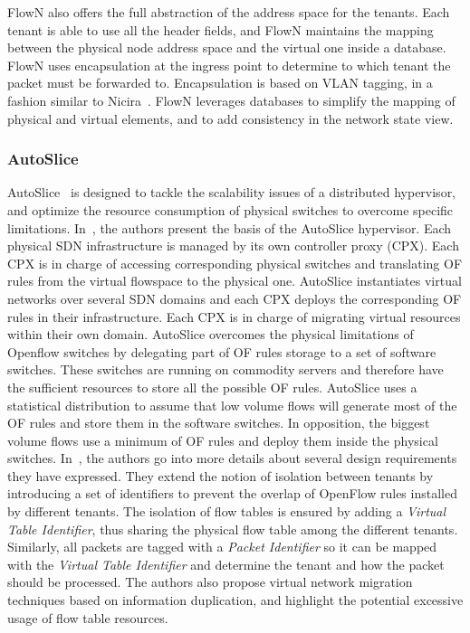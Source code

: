 FlowN also offers the full abstraction of the address space for the tenants.
Each tenant is able to use all the header fields, and FlowN maintains the mapping between the physical node address space and the virtual one inside a database. FlowN uses encapsulation at the ingress point to determine to which tenant the packet must be forwarded to. Encapsulation is based on VLAN tagging, in a fashion similar to Nicira~\cite{nicira}.   
FlowN leverages databases to simplify the mapping of physical and virtual elements, and to add consistency in the network state view.  


\subsubsection{AutoSlice}
AutoSlice~\cite{AutoSlice-Bozakov2012} is designed to tackle the scalability issues of a distributed hypervisor, and optimize the resource consumption of physical switches to overcome specific limitations.
In~\cite{AutoSlice-Bozakov2012}, the authors present the basis of the AutoSlice hypervisor.
Each physical SDN infrastructure is managed by its own controller proxy (CPX).
Each CPX is in charge of accessing corresponding physical switches and translating OF rules from the virtual flowspace to the physical one.
AutoSlice instantiates virtual networks over several SDN domains and each CPX deploys the corresponding OF rules in their infrastructure.
Each CPX is in charge of migrating virtual resources within their own domain.
AutoSlice overcomes the physical limitations of Openflow switches by delegating part of OF rules storage to a set of software switches.
These switches are running on commodity servers and therefore have the sufficient resources to store all the possible OF rules.
AutoSlice uses a statistical distribution to assume that low volume flows will generate most of the OF rules and store them in the software switches. In opposition, the biggest volume flows use a minimum of OF rules and deploy them inside the physical switches.
In~\cite{AutoSlice2-Bozakov2014}, the authors go into more details about several design requirements they have expressed. They extend the notion of isolation between tenants by introducing a set of identifiers to prevent the overlap of OpenFlow rules installed by different tenants.
The isolation of flow tables is ensured by adding a \textit{Virtual Table Identifier}, thus sharing the physical flow table among the different tenants.
Similarly, all packets are tagged with a \textit{Packet Identifier} so it can be mapped with the \textit{Virtual Table Identifier} and determine the tenant and how the packet should be processed.
The authors also propose virtual network migration techniques based on information duplication, and highlight the potential excessive usage of flow table resources.

